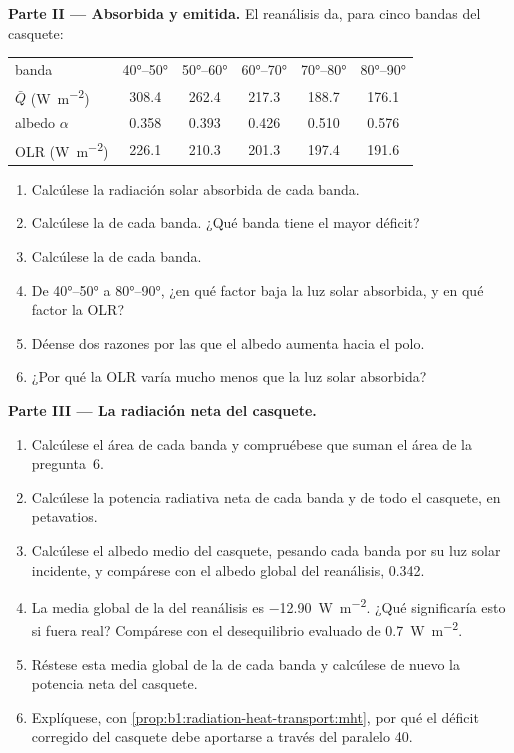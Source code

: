 \begin{problem}
\medskip
\noindent\textbf{Parte II --- Absorbida y emitida.} El reanálisis da, para cinco
bandas del casquete:
\begin{center}
\small
\begin{tabular}{|l|ccccc|}
\hline
banda & \ang{40}--\ang{50} & \ang{50}--\ang{60} & \ang{60}--\ang{70} & \ang{70}--\ang{80} & \ang{80}--\ang{90} \\
$\bar Q$ (\unit{W.m^{-2}}) & 308.4 & 262.4 & 217.3 & 188.7 & 176.1 \\
albedo $\alpha$ & 0.358 & 0.393 & 0.426 & 0.510 & 0.576 \\
OLR (\unit{W.m^{-2}}) & 226.1 & 210.3 & 201.3 & 197.4 & 191.6 \\
\hline
\end{tabular}
\end{center}
\begin{enumerate}[resume]
  \item Calcúlese la radiación solar absorbida de cada banda.
  \item Calcúlese la  de cada banda. ¿Qué banda tiene el mayor déficit?
  \item Calcúlese la  de cada banda.
  \item De \ang{40}--\ang{50} a \ang{80}--\ang{90}, ¿en qué factor baja la luz solar absorbida, y en qué factor la OLR?
  \item Déense dos razones por las que el albedo aumenta hacia el polo.
  \item ¿Por qué la OLR varía mucho menos que la luz solar absorbida?
\end{enumerate}

\medskip
\noindent\textbf{Parte III --- La radiación neta del casquete.}
\begin{enumerate}[resume]
  \item Calcúlese el área de cada banda y compruébese que suman el área de la
        pregunta~6.
  \item Calcúlese la potencia radiativa neta de cada banda y de todo el casquete, en petavatios.
  \item Calcúlese el albedo medio del casquete, pesando cada banda por su luz solar incidente, y compárese con el albedo global del reanálisis, \num{0.342}.
  \item La media global de la  del reanálisis es \qty{-12.90}{W.m^{-2}}. ¿Qué significaría esto si fuera real? Compárese con el desequilibrio evaluado de \qty{+0.7}{W.m^{-2}}.
  \item Réstese esta media global de la  de cada banda y calcúlese de nuevo la potencia neta del casquete.
  \item Explíquese, con \cref{prop:b1:radiation-heat-transport:mht}, por qué el déficit corregido del casquete debe aportarse a través del paralelo 40.
\end{enumerate}


\end{problem}
